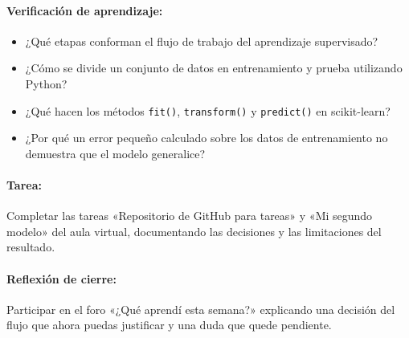 \documentclass[a4,11pt]{aleph-notas}
\begin{document}
\paragraph{Verificación de aprendizaje:}
\begin{itemize}[leftmargin=*]
\item ¿Qué etapas conforman el flujo de trabajo del aprendizaje supervisado?
\item ¿Cómo se divide un conjunto de datos en entrenamiento y prueba utilizando Python?
\item ¿Qué hacen los métodos \texttt{fit()}, \texttt{transform()} y \texttt{predict()} en scikit-learn?
\item ¿Por qué un error pequeño calculado sobre los datos de entrenamiento no demuestra que el modelo generalice?
\end{itemize}

\paragraph{Tarea:}
    Completar las tareas «Repositorio de GitHub para tareas» y «Mi segundo modelo» del aula virtual, documentando las decisiones y las limitaciones del resultado.

\paragraph{Reflexión de cierre:} Participar en el foro «¿Qué aprendí esta semana?» explicando una decisión del flujo que ahora puedas justificar y una duda que quede pendiente.
\end{document}
